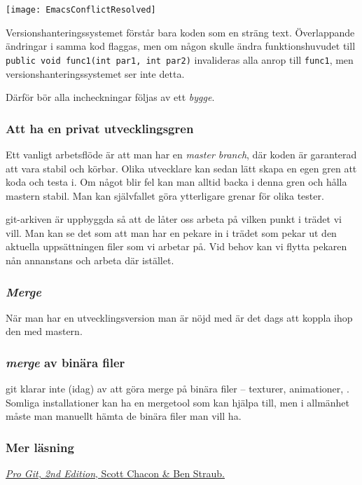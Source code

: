 \documentclass[swedish]{beamer}
\begin{document}
\begin{frame}
\texttt{[image: EmacsConflictResolved]}
\end{frame}

\begin{frame}[fragile]
Versionshanteringssystemet förstår bara koden som en sträng text.
Överlappande ändringar i samma kod flaggas, men om någon skulle ändra
funktionshuvudet till \lstinline+public void func1(int par1, int par2)+ invalideras alla anrop till \lstinline+func1+, men
versionshanteringssystemet ser inte detta.

Därför bör alla incheckningar följas av ett \emph{bygge}.
\end{frame}

\begin{frame}[fragile]
\frametitle{Att ha en privat utvecklingsgren}
Ett vanligt arbetsflöde är att man har en \emph{master branch}, där koden är garanterad att vara stabil och körbar.  Olika utvecklare kan sedan lätt skapa en egen gren att koda och testa i.  Om något blir fel kan man alltid backa i denna gren och hålla mastern stabil.  Man kan självfallet göra ytterligare grenar för olika tester.

git-arkiven är uppbyggda så att de låter oss arbeta på vilken punkt i trädet vi vill.  Man kan se det som att man har en pekare in i trädet som pekar ut den aktuella uppsättningen filer som vi arbetar på.  Vid behov kan vi flytta pekaren nån annanstans och arbeta där istället.
\end{frame}

\begin{frame}[fragile]
\frametitle{\emph{Merge}}

När man har en utvecklingsversion man är nöjd med är det dags att koppla ihop den med mastern.  

\end{frame}

\begin{frame}[fragile]
\frametitle{\emph{merge} av binära filer}
git klarar inte (idag) av att göra merge på binära filer -- \mao texturer, animationer, \odyl.  Somliga installationer kan ha en mergetool som kan hjälpa till, men i allmänhet måste man manuellt hämta de binära filer man vill ha.
  
\end{frame}


\begin{frame}[fragile]
\frametitle{Mer läsning}  
\href{http://git-scm.com/book/en/v2/}{\textsl{Pro Git, 2nd Edition}, Scott Chacon \& Ben Straub.}
\end{frame}
\end{document}
